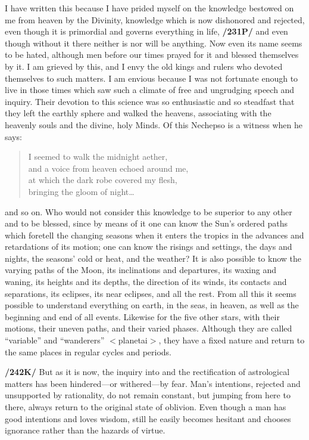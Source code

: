 I have written this because I have prided myself on the knowledge bestowed on me from heaven by the Divinity, knowledge which is now dishonored and rejected, even though it is primordial and governs everything in life, \textbf{/231P/} and even though without it there neither is nor will be anything. Now even its name seems to be hated, although men before our times prayed for it and blessed themselves by it. I am grieved by this, and I envy the old kings and rulers who devoted themselves to such matters. I am envious because I was not fortunate enough to live in those times which saw such a climate of free and ungrudging speech and inquiry. Their devotion to this science was so enthusiastic and so steadfast that they left the earthly sphere and walked the heavens, associating with the heavenly souls and the divine, holy Minds. Of this Nechepso is a witness when he says:
\begin{verse}
		I seemed to walk the midnight aether, \\
		and a voice from heaven echoed around me, \\
		at which the dark robe covered my flesh, \\
		bringing the gloom of night…\\
\end{verse}	
and so on. Who would not consider this knowledge to be superior to any other and to be blessed, since by means of it one can know the Sun’s ordered paths which foretell the changing seasons when it enters the tropics in the advances and retardations of its motion; one can know the risings and settings, the days and nights, the seasons’ cold or heat, and the weather? It is also possible to know the varying paths of the Moon, its inclinations and departures, its waxing and waning, its heights and its depths, the direction of its winds, its contacts and separations, its eclipses, its near eclipses, and all the rest. From all this it seems possible to understand everything on earth, in the seas, in heaven, as well as the beginning and end of all events. Likewise for the five other stars, with their motions, their uneven paths, and their varied phases. Although they are called “variable” and “wanderers” $<$planetai$>$, they have a fixed nature and return to the same places in regular cycles and periods. 

\textbf{/242K/} But as it is now, the inquiry into and the rectification of astrological matters has been hindered—or withered—by fear. Man’s intentions, rejected and unsupported by rationality, do not remain
constant, but jumping from here to there, always return to the original state of oblivion. Even though a man has good intentions and loves wisdom, still he easily becomes hesitant and chooses ignorance rather
than the hazards of virtue.

